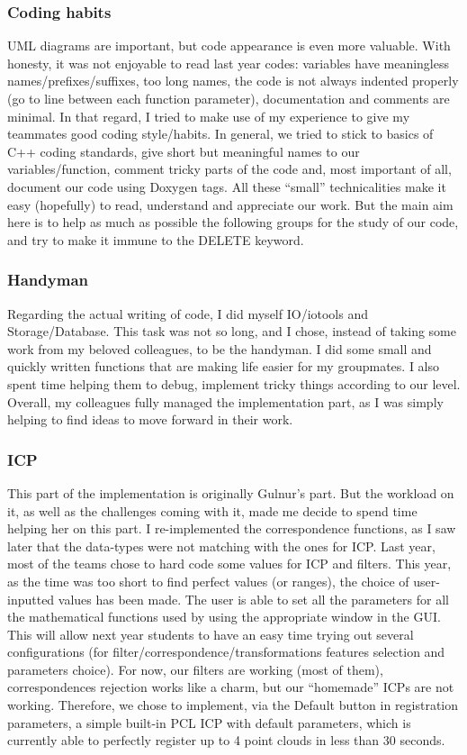 \documentclass[aps,letterpaper,11pt]{revtex4}
\begin{document}
\subsubsection{Coding habits}
 UML diagrams are important, but code appearance is even more valuable. With honesty, it was not enjoyable to read last year codes: variables have meaningless names/prefixes/suffixes, too long names, the code is not always indented properly (go to line between each function parameter), documentation and comments are minimal. In that regard, I tried to make use of my experience to give my teammates good coding style/habits. In general, we tried to stick to basics of C++ coding standards, give short but meaningful names to our variables/function, comment tricky parts of the code and, most important of all, document our code using Doxygen tags. All these “small”  technicalities make it easy (hopefully) to read, understand and appreciate our work. But the main aim here is to help as much as possible the following groups for the study of our code, and try to make it immune to the DELETE keyword.

\subsubsection{Handyman}
Regarding the actual writing of code, I did myself IO/iotools and Storage/Database. This task was not so long, and I chose, instead of taking some work from my beloved colleagues, to be the handyman. I did some small and quickly written functions that are making life easier for my groupmates. I also spent time helping them to debug, implement tricky things according to our level. Overall, my colleagues fully managed the implementation part, as I was simply helping to find ideas to move forward in their work.

\subsubsection{ICP}
This part of the implementation is originally Gulnur’s part. But the workload on it, as well as the challenges coming with it, made me decide to spend time helping her on this part. I re-implemented the correspondence functions, as I saw later that the data-types were not matching with the ones for ICP. Last year, most of the teams chose to hard code some values for ICP and filters. This year, as the time was too short to find perfect values (or ranges), the choice of user-inputted values has been made. The user is able to set all the parameters for all the mathematical functions used by using the appropriate window in the GUI. This will allow next year students to have an easy time trying out several configurations (for filter/correspondence/transformations features selection and parameters choice). For now, our filters are working (most of them), correspondences rejection works like a charm, but our “homemade” ICPs are not working. Therefore, we chose to implement, via the Default button in registration parameters, a simple built-in PCL ICP with default parameters, which is currently able to perfectly register up to 4 point clouds in less than 30 seconds.
\end{document}
